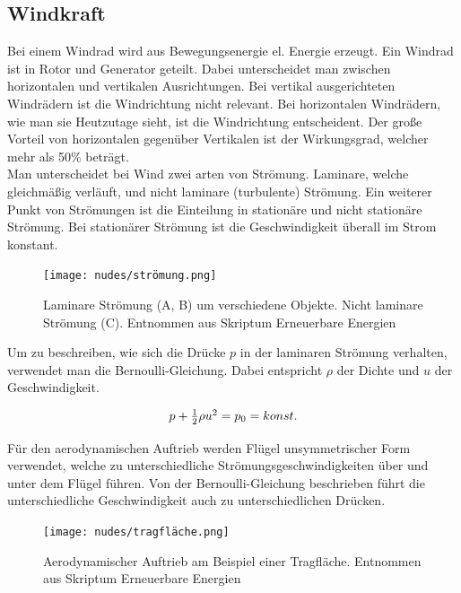 \documentclass[12pt,a4paper,twoside]{article}
\begin{document}
\subsection{Windkraft}
Bei einem Windrad wird aus Bewegungsenergie el. Energie erzeugt. Ein Windrad ist in Rotor und Generator geteilt. Dabei unterscheidet man zwischen horizontalen und vertikalen Ausrichtungen. Bei vertikal ausgerichteten Windrädern ist die Windrichtung nicht relevant. Bei horizontalen Windrädern, wie man sie Heutzutage sieht, ist die Windrichtung entscheident. Der große Vorteil von horizontalen gegenüber Vertikalen ist der Wirkungsgrad, welcher mehr als 50\% beträgt. 
\\
Man unterscheidet bei Wind zwei arten von Strömung. Laminare, welche gleichmäßig verläuft, und nicht laminare (turbulente) Strömung. 
Ein weiterer Punkt von Strömungen ist die Einteilung in stationäre und nicht stationäre Strömung. Bei stationärer Strömung ist die Geschwindigkeit überall im Strom konstant. 

\begin{figure}[H]
    \centering
    \texttt{[image: nudes/strömung.png]}
    \caption{Laminare Strömung (A, B) um verschiedene Objekte. Nicht laminare Strömung (C). Entnommen aus Skriptum Erneuerbare Energien \cite{teachcenter2}}
    \label{fig:strömung}
\end{figure}

\noindent
Um zu beschreiben, wie sich die Drücke $p$ in der laminaren Strömung verhalten, verwendet man die Bernoulli-Gleichung. Dabei entspricht $\rho$ der Dichte und $u$ der Geschwindigkeit.  

\begin{equation}
    \label{eq:bernoulli}
    \centerline{$p + \frac{1}{2} \rho u^2 = p_0 = konst. $}
\end{equation}

\noindent
Für den aerodynamischen Auftrieb werden Flügel unsymmetrischer Form verwendet, welche zu unterschiedliche Strömungsgeschwindigkeiten über und unter dem Flügel führen. Von der Bernoulli-Gleichung beschrieben führt die unterschiedliche Geschwindigkeit auch zu unterschiedlichen Drücken. 

\begin{figure}[H]
    \centering
    \texttt{[image: nudes/tragfläche.png]}
    \caption{Aerodynamischer Auftrieb am Beispiel einer Tragfläche. Entnommen aus Skriptum Erneuerbare Energien \cite{teachcenter2}}
    \label{fig:tragfläche}
\end{figure} 
\end{document}

